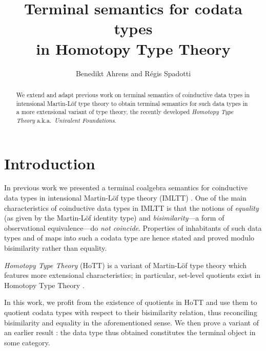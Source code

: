 \documentclass[envcountsame]{llncs}
\begin{document}
\title{Terminal semantics for codata types\\in Homotopy Type Theory}

\author{Benedikt Ahrens and R\'egis Spadotti}


\newcommand{\fat}[1]{\textbf{#1}}





\maketitle


\begin{abstract}

 We extend and adapt previous work on terminal semantics of coinductive data types in intensional Martin-Löf type theory to
 obtain terminal semantics for such data types in a more extensional variant of type theory, the recently developed 
 \emph{Homotopy Type Theory} a.k.a.\ \emph{Univalent Foundations}.
   
\end{abstract}




\section{Introduction}
 
 In previous work \parencite{trimat_coq} we presented a terminal coalgebra semantics for coinductive data types in
 intensional Martin-Löf type theory (IMLTT) \parencite{martin_lof}.
 One of the main characteristics of coinductive data types in IMLTT is that the notions of \emph{equality}
 (as given by the Martin-Löf identity type) and \emph{bisimilarity}---a form of observational equivalence---do \emph{not
 coincide}. Properties of inhabitants of such data types and of maps into such a codata type are hence stated and proved modulo bisimilarity rather than equality.
 
 \emph{Homotopy Type Theory} (HoTT) \parencite{hottbook} is a variant of Martin-Löf type theory which features more extensional 
 characteristics; in particular, set-level quotients exist in Homotopy Type Theory \parencite[Chap.\ 6.10]{hottbook}.
 
 In this work, we profit from the existence of quotients in HoTT and use them to quotient codata types with respect to their
 bisimilarity relation, thus reconciling bisimilarity and equality in the aforementioned sense.
 We then prove a variant of an earlier result \parencite{trimat_coq}: the data type thus obtained constitutes the terminal 
 object in some category.
 
 
\printbibliography


\appendix



% 
\end{document}
